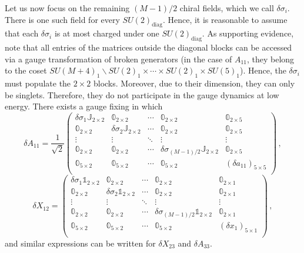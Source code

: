 \documentclass[a4paper,12pt]{article}
\begin{document}
{Let us now focus on the remaining $(M-1)/2$ chiral fields, which we call $\delta \sigma_{i}$. There is one such field for every $SU(2)_\text{diag}$. 
Hence, it is reasonable to assume that each $\delta \sigma_{i}$ is at most charged under one $SU(2)_\text{diag}$. As supporting evidence, note that all entries of the matrices outside the diagonal blocks can be accessed via a gauge transformation of broken generators (in the case of $A_{11}$, they belong to the coset $SU(M+4)_1 \backslash SU(2)_1\times \cdots \times SU(2)_1\times SU(5)_1$). Hence, the $\delta \sigma_{i}$ must populate the $2\times 2$ blocks. Moreover, due to their dimension, they can only be singlets. Therefore, they do not participate in the gauge dynamics at low energy. 
There exists a gauge fixing in which 
\begin{equation}
	\delta	{A}_{11} = \frac{1}{\sqrt{2}}\left(\begin{array}{cccc|c}
		\delta \sigma_1 \mathbb{J}_{2\times2} & \mathbb{0}_{2\times2} & \cdots & \mathbb{0}_{2\times2} & \mathbb{0}_{2\times5} \\
		\mathbb{0}_{2\times2} &  \delta \sigma_2 \mathbb{J}_{2\times2} & \cdots & \mathbb{0}_{2\times2} & \mathbb{0}_{2\times5} \\
		\vdots & \vdots  & \ddots & \vdots  & \vdots  \\
		\mathbb{0}_{2\times2} & \mathbb{0}_{2\times2} & \cdots &   \delta \sigma_{(M-1)/2} \mathbb{J}_{2\times2} & \mathbb{0}_{2\times5} \\ \hline
		\mathbb{0}_{5\times2} & \mathbb{0}_{5\times2} & \cdots &  \mathbb{0}_{5\times2} & (\delta a_{11})_{5\times5} \\
	\end{array} \right)\, ,
\end{equation}
\begin{equation}
	\delta {X}_{12} = \left(\begin{array}{cccc|c}
		\delta \sigma_1 \mathbb{1}_{2\times2}  & \mathbb{0}_{2\times2} & \cdots & \mathbb{0}_{2\times2} & \mathbb{0}_{2\times1} \\
		\mathbb{0}_{2\times2} & \delta \sigma_2 \mathbb{1}_{2\times2}  & \cdots & \mathbb{0}_{2\times2} & \mathbb{0}_{2\times1} \\
		\vdots & \vdots  & \ddots & \vdots & \vdots \\
		\mathbb{0}_{2\times2}  & \mathbb{0}_{2\times2}  &  \cdots &  \delta \sigma_{(M-1)/2} \mathbb{1}_{2\times2} &  \mathbb{0}_{2\times1}  \\ \hline
		\mathbb{0}_{5\times2} & \mathbb{0}_{5\times2} &  \cdots & \mathbb{0}_{5\times2} & (\delta x_1 )_{5\times1}   \\
	\end{array}\right)  \, , \label{Eq:Intermediate}
\end{equation}
and similar expressions can be written for $\delta X_{23}$ and $\delta A_{33}$.

}
\end{document}
